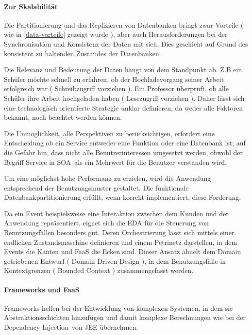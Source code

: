 \documentclass[
12pt,
english,
ngerman,
headsepline,
twoside,
openright,
numbers=noenddot,version=first
]{scrreprt}
\begin{document}
\paragraph{Zur Skalabilität}
Die Partitionierung und das Replizieren von Datenbanken bringt zwar Vorteile ( wie in \autoref{data-vorteile} gezeigt wurde ), aber auch Herausforderungen bei der Synchronisation und Konsistenz der Daten mit sich. Dies geschieht auf Grund des konsistent zu haltenden Zustandes der Datenbanken.

Die Relevanz und Bedeutung der Daten hängt von dem Standpunkt ab. Z.B ein Schüler möchte schnell zu erfahren, ob der Hochladevorgang seiner Arbeit erfolgreich war ( Schreibzugriff vorziehen ). Ein Professor überprüft, ob alle Schüler ihre Arbeit hochgeladen haben ( Lesezugriff vorziehen ). Daher lässt sich eine technologisch orientierte Strategie unklar definieren, da weder alle Faktoren bekannt, noch beachtet werden können. 


Die Unmöglichkeit, alle Perspektiven zu berücksichtigen, erfordert eine Entscheidung ob ein Service entweder eine Funktion oder eine Datenbank ist; auf die Gefahr hin, dass nicht alle Benutzerinteressen umgesetzt werden, obwohl der Begriff Service in \glqq \acrlong{SOA}\grqq\ als ein Mehrwert für die Benutzer verstanden wird. 

Um eine möglichst hohe Performanz zu erzielen, wird die Anwendung entsprechend der Benutzungsmuster gestaltet. Die funktionale Datenbankpartitionierung erfüllt, wenn korrekt implementiert, diese Forderung.

Da ein Event beispielsweise eine Interaktion zwischen dem Kunden und der Anwendung repräsentiert, eignet sich die \acrshort{EDA} für die Steuerung von Benutzungsfällen besonders gut. Deren Orchestrierung lässt sich mittels einer endlichen Zustandsmaschine definieren und einem Petrinetz darstellen, in dem Events die Kanten und \acrshort{FaaS} die Ecken sind. Dieser Ansatz ähnelt dem Domain getriebenen Entwurf ( Domain Driven Design \cite{ddd} ), in dem Benutzungsfälle in Kontextgrenzen ( Bounded Context ) zusammengefasst werden.


\paragraph{Frameworks und FaaS}
Frameworks helfen bei der Entwicklung von komplexen Systemen, in dem sie Abstraktionsschichten hinzufügen und damit komplexe Berechnungen wie bei der \glqq Dependency Injection\grqq\ von \acrfull{JEE} übernehmen. 
\end{document}
